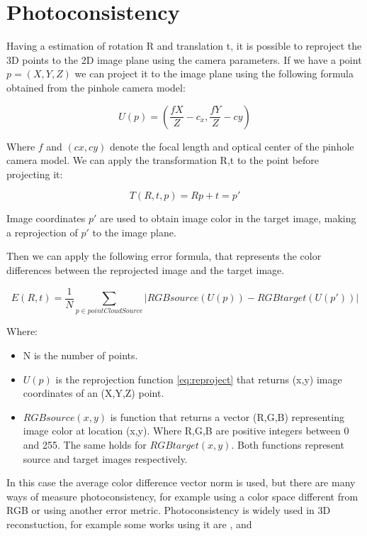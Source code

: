 \section{Photoconsistency}

Having a estimation of rotation R and translation t, it is possible to reproject the 3D points to the 2D image plane using the 
camera parameters. If we have a point $p=(X,Y,Z)$ we can project it to the image plane using the following formula obtained 
from the pinhole camera model:

\begin{equation}
U(p) = (\frac{fX}{Z} - c_x, \frac{fY}{Z} - cy)
\label{eq:reproject}
\end{equation}

Where $f$ and $(cx,cy)$ denote the focal length and optical center of the pinhole camera model. 
We can apply the transformation R,t to the point before projecting it:

\begin{equation}
T(R,t,p) = Rp + t = p'
\end{equation}

Image coordinates  $p'$ are used to obtain image color in the target image, making a reprojection of $p'$ to the image plane.

Then we can apply the following error formula, that represents the color differences between the reprojected image and 
the target image. 

\begin{equation}
E(R,t) = \frac{1}{N} \sum\limits_{p \in pointCloudSource} |RGBsource(U(p)) - RGBtarget(U(p'))|
\end{equation}


Where:
\begin{itemize}
\item N is the number of points.
\item $U(p)$ is the reprojection function \ref{eq:reproject} that returns (x,y) image coordinates of an (X,Y,Z) point.
\item  $RGBsource(x,y)$ is function that returns a vector (R,G,B) representing image color at location (x,y). Where 
R,G,B are positive integers between 0 and 255. The same holds for $RGBtarget(x,y)$. Both functions represent 
source and target images respectively.
\end{itemize}

In this case the average color difference vector norm is used, but there are many ways of measure photoconsistency, 
for example using a color space different from RGB or using another error metric. Photoconsistency is widely used in 3D reconstuction, for example some works using it are \cite{Whelan13},\cite{kerl13icra} and \cite{Newcombe10livedense}

